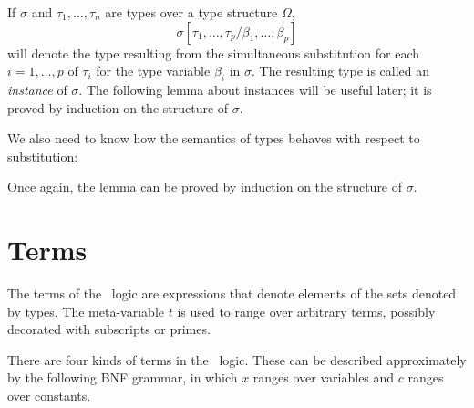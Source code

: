 If $\sigma$ and $\tau_1,\ldots,\tau_n$ are types over a type structure
$\Omega$, 
\[
\sigma[\tau_{1},\ldots,\tau_{p}/\beta_{1},\ldots,\beta_{p}]
\]
will denote the type resulting from the simultaneous substitution for
each $i=1,\ldots,p$ of
$\tau_i$ for the type variable $\beta_i$ in $\sigma$.
The resulting type is called an {\it instance\/} of $\sigma$. The
following lemma about instances will be useful later; it is proved by
induction on the structure of $\sigma$.

\medskip


\medskip

We also need to know how the semantics of types behaves with respect
to substitution:

\medskip

Once again, the lemma can be proved by induction on the structure of
$\sigma$.  

\section{Terms}
\label{terms}

The terms of the \HOL\ logic are expressions that denote elements of the sets
denoted by types. The meta-variable $t$
is used to range over arbitrary terms, possibly decorated
with subscripts or primes.

There are four kinds of terms in the \HOL\ logic. These can be
described approximately by the following {\small BNF} grammar, in
which $x$ ranges over variables and $c$ ranges over constants.

